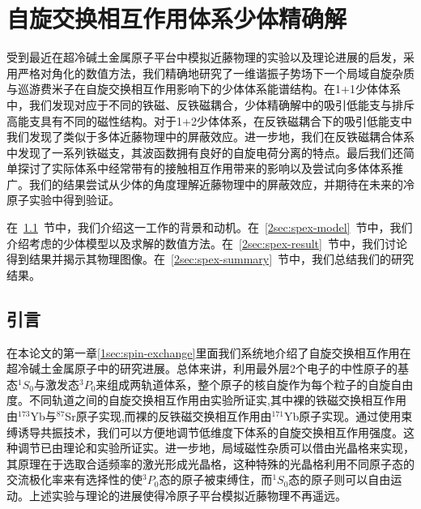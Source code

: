 \chapter{自旋交换相互作用体系少体精确解}\label{chap:kondo}

受到最近在超冷碱土金属原子平台中模拟近藤物理的实验以及理论进展的启发，采用严格对角化的数值方法，我们精确地研究了一维谐振子势场下一个局域自旋杂质与巡游费米子在自旋交换相互作用影响下的少体体系能谱结构。在1+1少体体系中，我们发现对应于不同的铁磁、反铁磁耦合，少体精确解中的吸引低能支与排斥高能支具有不同的磁性结构。对于1+2少体体系，在反铁磁耦合下的吸引低能支中我们发现了类似于多体近藤物理中的屏蔽效应。进一步地，我们在反铁磁耦合体系中发现了一系列铁磁支，其波函数拥有良好的自旋电荷分离的特点。最后我们还简单探讨了实际体系中经常带有的接触相互作用带来的影响以及尝试向多体体系推广。我们的结果尝试从少体的角度理解近藤物理中的屏蔽效应，并期待在未来的冷原子实验中得到验证。

在~\ref{2sec:spex-intro}~节中，我们介绍这一工作的背景和动机。在~\ref{2sec:spex-model}~节中，我们介绍考虑的少体模型以及求解的数值方法。在~\ref{2sec:spex-result}~节中，我们讨论得到结果并揭示其物理图像。在~\ref{2sec:spex-summary}~节中，我们总结我们的研究结果。

\section{引言}\label{2sec:spex-intro}
在本论文的第一章\ref{1sec:spin-exchange}里面我们系统地介绍了自旋交换相互作用在超冷碱土金属原子中的研究进展。总体来讲，利用最外层2个电子的中性原子的基态${}^1S_0$与激发态${}^3P_0$来组成两轨道体系，整个原子的核自旋作为每个粒子的自旋自由度。不同轨道之间的自旋交换相互作用由实验所证实,其中裸的铁磁交换相互作用由${}^{173}$Yb\cite{scazza2014observation,cappellini2014direct}与${}^{87}$Sr\cite{zhang2014spectroscopic}原子实现,而裸的反铁磁交换相互作用由${}^{171}$Yb\cite{ono2019antiferromagnetic}原子实现。通过使用束缚诱导共振技术，我们可以方便地调节低维度下体系的自旋交换相互作用强度。这种调节已由理论和实验所证实\cite{zhang2016kondo,cheng2017enhancing,zhang2018control,ji2018confinement,zhang2020tight,zhang2020controlling,riegger2018localized}。进一步地，局域磁性杂质可以借由光晶格来实现，其原理在于选取合适频率的激光形成光晶格，这种特殊的光晶格利用不同原子态的交流极化率来有选择性的使${}^3P_0$态的原子被束缚住，而${}^1S_0$态的原子则可以自由运动\cite{riegger2018localized,barber2008optical}。上述实验与理论的进展使得冷原子平台模拟近藤物理不再遥远。

